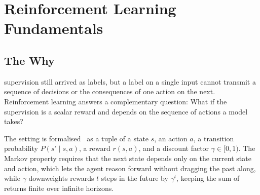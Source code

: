 
\chapter{Reinforcement Learning Fundamentals}


\section{The Why}


 supervision still arrived as labels, 
but a label on a single input cannot transmit a sequence of decisions
or the consequences of one action on the next.
Reinforcement learning answers a complementary question:
What if the supervision is a scalar reward and depends on the sequence of actions a model takes?





The setting is formalised~\cite{Bellman1961} as a tuple of a state $s$, an action $a$,
a transition probability $P(s' \mid s, a)$, a reward $r(s, a)$, and a discount factor $\gamma \in [0, 1)$.
The Markov property requires that the next state depends only on the current state and action,
which lets the agent reason forward without dragging the past along,
while $\gamma$ downweights rewards $t$ steps in the future by $\gamma^t$, keeping the sum of returns finite over infinite horizons.


